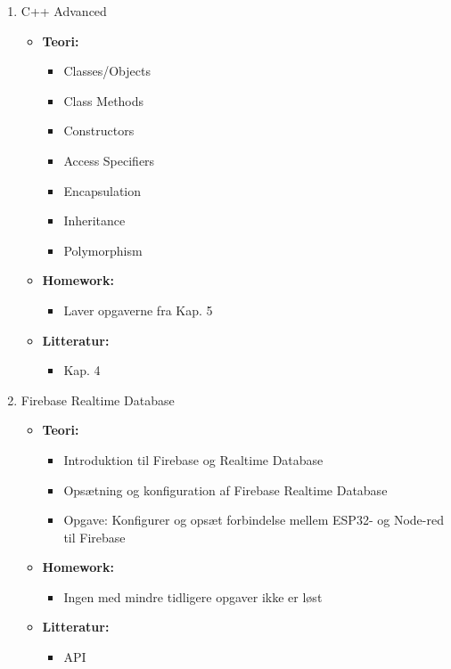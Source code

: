 \documentclass[12pt,a4paper]{article}
\begin{document}
\begin{enumerate}[leftmargin=*, label=\textbf{Dag \arabic* (3 timer)}]
	\item C++ Advanced
	\begin{itemize}
		\item \textbf{Teori:}
		\begin{itemize}
			\item Classes/Objects
			\item Class Methods
			\item Constructors
			\item Access Specifiers
			\item Encapsulation
			\item Inheritance
			\item  Polymorphism
		\end{itemize}
		\item \textbf{Homework:}
		\begin{itemize}
			\item Laver opgaverne fra Kap. 5
		\end{itemize}
		\item \textbf{Litteratur:}
		\begin{itemize}
			\item Kap. 4
		\end{itemize}
	\end{itemize}

	\item Firebase Realtime Database
	\begin{itemize}
		\item \textbf{Teori:}
		\begin{itemize}
			\item Introduktion til Firebase og Realtime Database
			\item Opsætning og konfiguration af Firebase Realtime Database
			\item Opgave: Konfigurer og opsæt forbindelse mellem ESP32- og Node-red til Firebase 
		\end{itemize}
		\item  \textbf{Homework:}
		\begin{itemize}
			\item Ingen med mindre tidligere opgaver ikke er løst
		\end{itemize}
		\item \textbf{Litteratur:}
		\begin{itemize}
			\item API
		\end{itemize}
	\end{itemize}


\end{enumerate}
\end{document}
